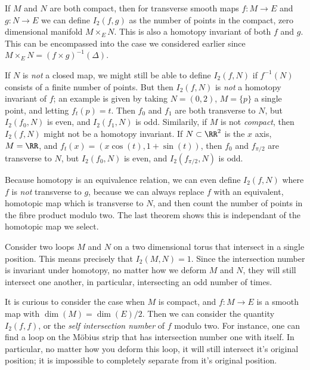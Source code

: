 \begin{remark}
    If $M$ and $N$ are both compact, then for transverse smooth maps $f: M \to E$ and $g: N \to E$ we can define $I_2(f,g)$ as the number of points in the compact, zero dimensional manifold $M \times_E N$. This is also a homotopy invariant of both $f$ and $g$. This can be encompassed into the case we considered earlier since $M \times_E N = (f \times g)^{-1}(\Delta)$.
\end{remark}

\begin{remark}
    If $N$ is \emph{not} a closed map, we might still be able to define $I_2(f,N)$ if $f^{-1}(N)$ consists of a finite number of points. But then $I_2(f,N)$ is \emph{not} a homotopy invariant of $f$; an example is given by taking $N = (0,2)$, $M = \{ p \}$ a single point, and letting $f_t(p) = t$. Then $f_0$ and $f_1$ are both transverse to $N$, but $I_2(f_0,N)$ is even, and $I_2(f_1,N)$ is odd. Similarily, if $M$ is not \emph{compact}, then $I_2(f,N)$ might not be a homotopy invariant. If $N \subset \RR^2$ is the $x$ axis, $M = \RR$, and $f_t(x) = (x \cos(t), 1 + \sin(t))$, then $f_0$ and $f_{\pi/2}$ are transverse to $N$, but  $I_2(f_0,N)$ is even, and $I_2(f_{\pi/2}, N)$ is odd.
\end{remark}

Because homotopy is an equivalence relation, we can even define $I_2(f,N)$ where $f$ is \emph{not} transverse to $g$, because we can always replace $f$ with an equivalent, homotopic map which is transverse to $N$, and then count the number of points in the fibre product modulo two. The last theorem shows this is independant of the homotopic map we select.

\begin{example}
    Consider two loops $M$ and $N$ on a two dimensional torus that intersect in a single position. This means precisely that $I_2(M,N) = 1$. Since the intersection number is invariant under homotopy, no matter how we deform $M$ and $N$, they will still intersect one another, in particular, intersecting an odd number of times.
\end{example}

It is curious to consider the case when $M$ is compact, and $f: M \to E$ is a smooth map with $\dim(M) = \dim(E)/2$. Then we can consider the quantity $I_2(f,f)$, or the \emph{self intersection number} of $f$ modulo two. For instance, one can find a loop on the M\"{o}bius strip that has intersection number one with itself. In particular, no matter how you deform this loop, it will still intersect it's original position; it is impossible to completely separate from it's original position.

